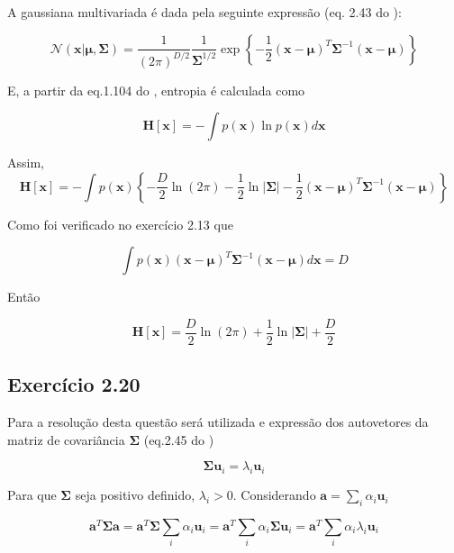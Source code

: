 \documentclass{article}
\begin{document}
    A gaussiana multivariada é dada pela seguinte expressão (eq. 2.43 do \cite{Bishop2006}):
    
   \begin{equation}
   	\mathcal{N}(\mathbf{x}|\boldsymbol{\mu},\boldsymbol{\Sigma})=\frac{1}{(2\pi)^{D/2}}\frac{1}{\boldsymbol{\Sigma}^{1/2}}\exp\left\{ -\frac{1}{2}(\mathbf{x}-\boldsymbol{\mu})^{T} \boldsymbol{\Sigma}^{-1} (\mathbf{x}-\boldsymbol{\mu})\right\}                             
   \end{equation}
   
   E, a  partir da eq.1.104 do \cite{Bishop2006}, entropia é calculada como
   
   \begin{equation}
   	\mathbf{H}[\mathbf{x}] = - \int p(\mathbf{x}) \ln p(\mathbf{x})d\mathbf{x}
   \end{equation}
   
   Assim,
    \[
      \mathbf{H}[\mathbf{x}] = - \int p(\mathbf{x}) \left\{  - \frac{D}{2} \ln (2\pi) - \frac{1}{2} \ln{|\boldsymbol{\Sigma}|} - \frac{1}{2}(\mathbf{x}-\boldsymbol{\mu})^{T}\boldsymbol{\Sigma}^{-1}(\mathbf{x}-\boldsymbol{\mu}) \right\}
    \]
  
   Como foi verificado no exercício 2.13 que
   
   \[
    \int p(\textbf{x})(\mathbf{x}-\boldsymbol{\mu})^{T}\boldsymbol{\Sigma}^{-1}(\mathbf{x}-\boldsymbol{\mu})d\textbf{x} = D
   \]
   
   Então
   
   \[
      \mathbf{H}[\mathbf{x}] = \frac{D}{2} \ln (2\pi) + \frac{1}{2} \ln{|\boldsymbol{\Sigma}|} + \frac{D}{2}
   \]
    
\subsection{ Exerc\'icio 2.20}

   Para a resolução desta questão será utilizada e expressão dos autovetores da matriz de covariância $\boldsymbol{\Sigma}$ (eq.2.45 do \cite{Bishop2006})
   
    \begin{equation}
    	\boldsymbol{\Sigma} \mathbf{u}_{i} = \lambda_{i}\mathbf{u}_{i}
    \end{equation}
    
   Para que $\boldsymbol{\Sigma}$ seja positivo definido, $\lambda_{i} > 0$. Considerando $\mathbf{a} = \sum_{i} \alpha_{i} \mathbf{u}_{i}$
   
   \[
    \mathbf{a}^{T}\boldsymbol{\Sigma} \mathbf{a} = \mathbf{a}^{T}\boldsymbol{\Sigma} \sum_{i} \alpha_{i} \mathbf{u}_{i} = \mathbf{a}^{T} \sum_{i} \alpha_{i}\boldsymbol{\Sigma}\mathbf{u}_{i} =  \mathbf{a}^{T} \sum_{i} \alpha_{i}\lambda_{i}\mathbf{u}_{i} 
   \] 
   
\end{document}
